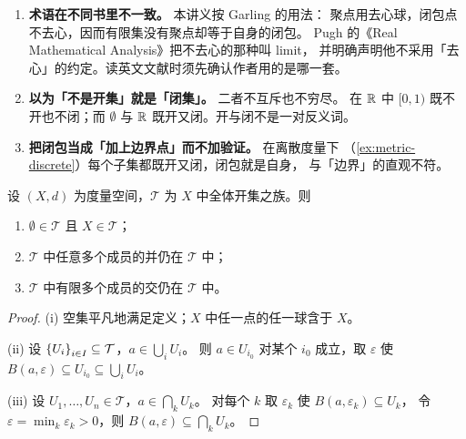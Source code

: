 \begin{pitfall}
  \begin{enumerate}[label=(\arabic*), leftmargin=1.6em]
    \item \textbf{术语在不同书里不一致。} 本讲义按 Garling 的用法：
          聚点用去心球，闭包点不去心，因而有限集没有聚点却等于自身的闭包。
          Pugh 的《Real Mathematical Analysis》把不去心的那种叫 limit，
          并明确声明他不采用「去心」的约定。读英文文献时须先确认作者用的是哪一套。
    \item \textbf{以为「不是开集」就是「闭集」。} 二者不互斥也不穷尽。
          在 \(\mathbb{R}\) 中 \([0,1)\) 既不开也不闭；而 \(\emptyset\) 与 \(\mathbb{R}\)
          既开又闭。开与闭不是一对反义词。
    \item \textbf{把闭包当成「加上边界点」而不加验证。} 在离散度量下
          （\cref{ex:metric-discrete}）每个子集都既开又闭，闭包就是自身，
          与「边界」的直观不符。
  \end{enumerate}
\end{pitfall}

\begin{theorem}[度量诱导拓扑]
  \label{thm:metric-topology}
  设 \((X,d)\) 为度量空间，\(\mathcal{T}\) 为 \(X\) 中全体开集之族。则
  \begin{enumerate}[label=(\roman*)]
    \item \(\emptyset \in \mathcal{T}\) 且 \(X \in \mathcal{T}\)；
    \item \(\mathcal{T}\) 中任意多个成员的并仍在 \(\mathcal{T}\) 中；
    \item \(\mathcal{T}\) 中有限多个成员的交仍在 \(\mathcal{T}\) 中。
  \end{enumerate}
\end{theorem}

\begin{proof}
  (i) 空集平凡地满足定义；\(X\) 中任一点的任一球含于 \(X\)。

  (ii) 设 \(\left\{U_{i}\right\}_{i \in I} \subseteq \mathcal{T}\)，\(a \in \bigcup_{i} U_{i}\)。
  则 \(a \in U_{i_{0}}\) 对某个 \(i_{0}\) 成立，取 \(\varepsilon\) 使
  \(B(a,\varepsilon) \subseteq U_{i_{0}} \subseteq \bigcup_{i} U_{i}\)。

  (iii) 设 \(U_{1},\dots,U_{n} \in \mathcal{T}\)，\(a \in \bigcap_{k} U_{k}\)。
  对每个 \(k\) 取 \(\varepsilon_{k}\) 使 \(B(a,\varepsilon_{k}) \subseteq U_{k}\)，
  令 \(\varepsilon = \min_{k}\varepsilon_{k} > 0\)，则 \(B(a,\varepsilon) \subseteq \bigcap_{k}U_{k}\)。
\end{proof}

